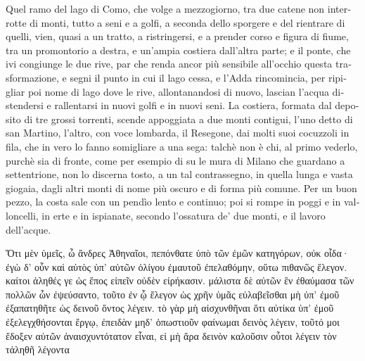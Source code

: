 \documentclass{book}
\begin{document}
\begin{italian}
  \meaning\theledlanguageL
  \meaning\theledlanguageR
	Quel ramo del lago di Como, che volge a mezzogiorno, tra due catene non interrotte di monti, tutto a seni e a golfi, a seconda dello sporgere e del rientrare di quelli, vien, quasi a un tratto, a ristringersi, e a prender corso e figura di fiume, tra un promontorio a destra, e un’ampia costiera dall’altra parte; e il ponte, che ivi congiunge le due rive, par che renda ancor più sensibile all’occhio questa trasformazione, e segni il punto in cui il lago cessa, e l’Adda rincomincia, per ripigliar poi nome di lago dove le rive, allontanandosi di nuovo, lascian l’acqua distendersi e rallentarsi in nuovi golfi e in nuovi seni. La costiera, formata dal deposito di tre grossi torrenti, scende appoggiata a due monti contigui, l’uno detto di san Martino, l’altro, con voce lombarda, il Resegone, dai molti suoi cocuzzoli in fila, che in vero lo fanno somigliare a una sega: talchè non è chi, al primo vederlo, purchè sia di fronte, come per esempio di su le mura di Milano che guardano a settentrione, non lo discerna tosto, a un tal contrassegno, in quella lunga e vasta giogaia, dagli altri monti di nome più oscuro e di forma più comune. Per un buon pezzo, la costa sale con un pendìo lento e continuo; poi si rompe in poggi e in valloncelli, in erte e in ispianate, secondo l’ossatura de’ due monti, e il lavoro dell’acque.
\end{italian}

\begin{greek}
	Ὅτι μὲν ὑμεῖς, ὦ ἄνδρες Ἀθηναῖοι, πεπόνθατε ὑπὸ τῶν ἐμῶν κατηγόρων, οὐκ οἶδα· ἐγὼ δ' οὖν καὶ αὐτὸς ὑπ' αὐτῶν ὀλίγου ἐμαυτοῦ ἐπελαθόμην, οὕτω πιθανῶς ἔλεγον. καίτοι ἀληθές γε ὡς ἔπος εἰπεῖν οὐδὲν εἰρήκασιν. μάλιστα δὲ αὐτῶν ἓν ἐθαύμασα τῶν πολλῶν ὧν ἐψεύσαντο, τοῦτο ἐν ᾧ ἔλεγον ὡς χρῆν ὑμᾶς εὐλαβεῖσθαι μὴ ὑπ' ἐμοῦ ἐξαπατηθῆτε ὡς δεινοῦ ὄντος λέγειν. τὸ γὰρ μὴ αἰσχυνθῆναι ὅτι αὐτίκα ὑπ' ἐμοῦ ἐξελεγχθήσονται ἔργῳ, ἐπειδὰν μηδ' ὁπωστιοῦν φαίνωμαι δεινὸς λέγειν, τοῦτό μοι ἔδοξεν αὐτῶν ἀναισχυντότατον εἶναι, εἰ μὴ ἄρα δεινὸν καλοῦσιν οὗτοι λέγειν τὸν τἀληθῆ λέγοντα
\end{greek}
\end{document}
